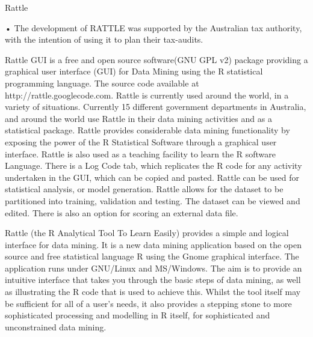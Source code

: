 
Rattle

•	The development of RATTLE was supported by the Australian tax authority, with the intention of using it to plan their tax-audits.

Rattle GUI is a free and open source software(GNU GPL v2) package providing a graphical user interface (GUI) for Data Mining using the R statistical programming language. The source code available at http://rattle.googlecode.com. Rattle is currently used around the world, in a variety of situations. Currently 15 different government departments in Australia, and around the world use Rattle in their data mining activities and as a statistical package.
Rattle provides considerable data mining functionality by exposing the power of the R Statistical Software through a graphical user interface. Rattle is also used as a teaching facility to learn the R software Language. There is a Log Code tab, which replicates the R code for any activity undertaken in the GUI, which can be copied and pasted. Rattle can be used for statistical analysis, or model generation. Rattle allows for the dataset to be partitioned into training, validation and testing. The dataset can be viewed and edited. There is also an option for scoring an external data file.


Rattle (the R Analytical Tool To Learn Easily) provides a simple and logical interface for data mining. It is a new data mining application based on the open source and free statistical language R using the Gnome graphical interface. The application runs under GNU/Linux and MS/Windows. The aim is to provide an intuitive interface that takes you through the basic steps of data mining, as well as illustrating the R code that is used to achieve this. Whilst the tool itself may be sufficient for all of a user's needs, it also provides a stepping stone to more sophisticated processing and modelling in R itself, for sophisticated and unconstrained data mining.


